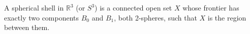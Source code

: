 A spherical shell in $\mathbb{R}^3$ (or $S^3$) is a connected open set $X$ whose frontier has exactly two components $B_0$ and $B_1$, both 2-spheres, such that $X$ is the region between them.
